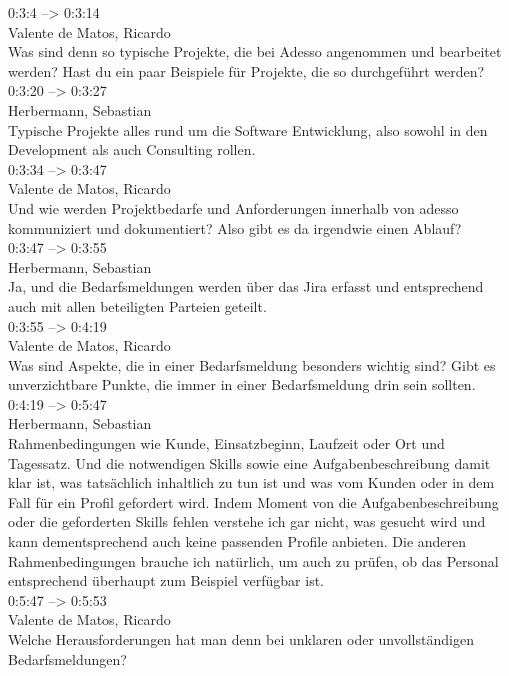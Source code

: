 0:3:4 --> 0:3:14\\
Valente de Matos, Ricardo\\
Was sind denn so typische Projekte, die bei Adesso angenommen und bearbeitet werden? Hast du ein paar Beispiele für Projekte, die so durchgeführt werden?\\

0:3:20 --> 0:3:27\\
Herbermann, Sebastian\\
Typische Projekte alles rund um die Software Entwicklung, also sowohl in den Development als auch Consulting rollen.\\

0:3:34 --> 0:3:47\\
Valente de Matos, Ricardo\\
Und wie werden Projektbedarfe und Anforderungen innerhalb von adesso kommuniziert und dokumentiert? Also gibt es da irgendwie einen Ablauf?\\

0:3:47 --> 0:3:55\\
Herbermann, Sebastian\\
Ja, und die Bedarfsmeldungen werden über das Jira erfasst und entsprechend auch mit allen beteiligten Parteien geteilt.\\

0:3:55 --> 0:4:19\\
Valente de Matos, Ricardo\\
Was sind Aspekte, die in einer Bedarfsmeldung besonders wichtig sind? Gibt es unverzichtbare Punkte, die immer in einer Bedarfsmeldung drin sein sollten.\\

0:4:19 --> 0:5:47\\
Herbermann, Sebastian\\
Rahmenbedingungen wie Kunde, Einsatzbeginn, Laufzeit oder Ort und Tagessatz. Und die notwendigen Skills sowie eine Aufgabenbeschreibung damit klar ist, was tatsächlich inhaltlich zu tun ist und was vom Kunden oder in dem Fall für ein Profil gefordert wird. Indem Moment von die Aufgabenbeschreibung oder die geforderten Skills fehlen verstehe ich gar nicht, was gesucht wird und kann dementsprechend auch keine passenden Profile anbieten. Die anderen Rahmenbedingungen brauche ich natürlich, um auch zu prüfen, ob das Personal entsprechend überhaupt zum Beispiel verfügbar ist.\\

0:5:47 --> 0:5:53\\
Valente de Matos, Ricardo\\
Welche Herausforderungen hat man denn bei unklaren oder unvollständigen Bedarfsmeldungen?\\

